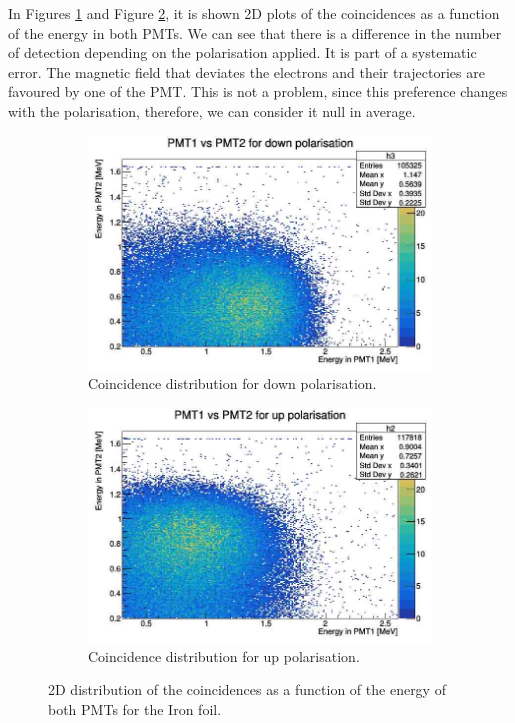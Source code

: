 \documentclass[10pt,swedish, openany]{book}
\begin{document}
In Figures \ref{fig:Poldown} and Figure \ref{fig:Polup}, it is shown 2D plots of the coincidences as a function of the energy in both PMTs. We can see that there is a difference in the number of detection depending on the polarisation applied. It is part of a systematic error. The magnetic field that deviates the electrons and their trajectories are favoured by one of the PMT. This is not a problem, since this preference changes with the polarisation, therefore, we can consider it null in average.

\begin{figure}[H]
\begin{subfigure}{.5\textwidth}
  \centering
  \includegraphics[width=.8\linewidth]{downPolX.jpg}  
  \caption{Coincidence distribution for down polarisation.}
  \label{fig:Poldown}
\end{subfigure}
\begin{subfigure}{.5\textwidth}
  \centering
  \includegraphics[width=.8\linewidth]{UPPolX.jpg}  
  \caption{Coincidence distribution for up polarisation.}
  \label{fig:Polup}
\end{subfigure}
\caption{2D distribution of the coincidences as a function of the energy of both PMTs for the Iron foil.}
\label{fig:fig}
\end{figure}
\end{document}
